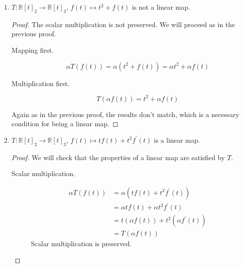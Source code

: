\documentclass{article}
\renewcommand{\a}{\alpha}
\newcommand{\R}{\mathbb{R}}
\begin{document}
\begin{enumerate}
\begin{enumerate}
            \item $T : \R[t]_2 \to \R[t]_3$, $f(t) \mapsto t^2 + f(t)$ is not a linear map.
                \begin{proof}
                    The scalar multiplication is not preserved. We will proceed as in the previous proof.
                    \begin{description}
                        \item[Mapping first.]
                            \begin{equation}
                                \a T(f(t)) = \a (t^2 + f(t)) = \a t^2 + \a f(t)
                                \label{eqn:1dmappingfirst}
                            \end{equation}
                        \item[Multiplication first.]
                            \begin{equation}
                                T(\a f(t)) = t^2 + \a f(t)
                                \label{eqn:1dmultiplyfirst}
                            \end{equation}
                    \end{description}
                    Again as in the previous proof, the results don't match, which is a necessary condition for being a linear map.
                \end{proof}

            \item $T : \R[t]_2 \to \R[t]_3$, $f(t) \mapsto t f(t) + t^2 f^\prime (t)$ is a linear map.
                \begin{proof}
                    We will check that the properties of a linear map are satisfied by $T$.
                    \begin{description}
                        \item[Scalar multiplication.]
                            \begin{align*}
                                \a T(f(t)) &= \a (t f(t) + t^2 f^\prime (t)) \\
                                           &= \a t f(t) + \a t^2 f^\prime (t) \\
                                           &= t (\a f(t)) + t^2 (\a f^\prime (t)) \\
                                           &= T(\a f(t))
                            \end{align*}
                            Scalar multiplication is preserved.


\end{description}
\end{proof}
\end{enumerate}
\end{enumerate}
\end{document}
